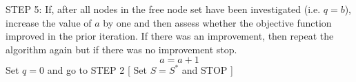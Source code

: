 \documentclass[11pt]{article}
\begin{document}
\begin{algorithm}
\begin{algorithmic}[0]
		\Statex 
		\Statex STEP 5: If, after all nodes in the free node set have been investigated (i.e. $q=b$), increase the value of $a$ by one and then assess whether the objective function improved in the prior iteration.  If there was an improvement, then repeat the algorithm again but if there was no improvement stop.
		\begin{equation*}
			a = a+1
		\end{equation*}
		\Statex Set $q=0$ and go to STEP 2
		[
		\Statex Set $S=S^*$ and STOP
		]
		\EndIf
		
		
	\end{algorithmic}
\end{algorithm}

\end{document}
